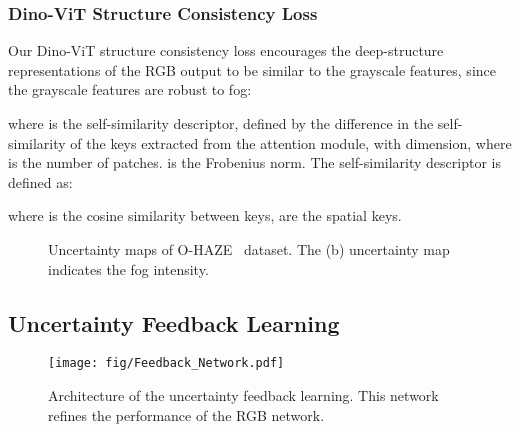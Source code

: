 \documentclass[runningheads]{llncs}
\begin{document}
\subsubsection{Dino-ViT Structure Consistency Loss}
Our Dino-ViT structure consistency loss encourages the deep-structure representations of the RGB output to be similar to the grayscale features, since the grayscale features are robust to fog: 
 
where  is the self-similarity descriptor, defined by the difference in the self-similarity of the keys extracted from the attention module, with  dimension, where  is the number of patches. 
 is the Frobenius norm.
The self-similarity descriptor is defined as:
 
where  is the cosine similarity between keys,  are the spatial keys. 

\begin{figure}[t]
	\centering
		\captionsetup[subfloat]{labelformat=empty}
		\setcounter{subfigure}{0}
		\hfill
		\hfill
		\hfill
		\setcounter{subfigure}{0}
		\hfill
		\hfill
		\hfill
	\caption{Uncertainty maps of O-HAZE~\cite{ancuti2018haze} dataset. The (b) uncertainty map indicates the fog intensity.}
	\label{fig:density}
\end{figure}

\subsection{Uncertainty Feedback Learning}
\begin{figure}[t]
	\centering
	{\texttt{[image: fig/Feedback\_Network.pdf]}}\hfill
	\caption{Architecture of the uncertainty feedback learning. This network refines the performance of the RGB network.}
	\label{fig:feedback_net}
\end{figure}
\end{document}
